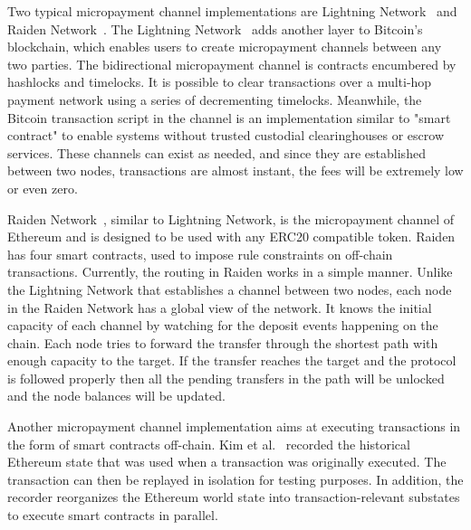 \documentclass[acmsmall]{acmart}
\begin{document}
Two typical micropayment channel implementations are Lightning Network~\cite{poon2016bitcoin} and Raiden Network~\cite{network2018raiden}.
The Lightning Network~\cite{poon2016bitcoin} adds another layer to Bitcoin’s blockchain, which enables users to create micropayment channels between any two parties. The bidirectional micropayment channel is contracts encumbered by hashlocks and timelocks. It is possible to clear transactions over a multi-hop payment network using a series of decrementing timelocks. Meanwhile, the Bitcoin transaction script in the channel is an implementation similar to "smart contract" to enable systems without trusted custodial clearinghouses or escrow services. These channels can exist as needed, and since they are established between two nodes, transactions are almost instant, the fees will be extremely low or even zero.



Raiden Network~\cite{network2018raiden}, similar to Lightning Network, is the micropayment channel of Ethereum and is designed to be used with any ERC20 compatible token. Raiden has four smart contracts, used to impose rule constraints on off-chain transactions. Currently, the routing in Raiden works in a simple manner. Unlike the Lightning Network that establishes a channel between two nodes, each node in the Raiden Network has a global view of the network. It knows the initial capacity of each channel by watching for the deposit events happening on the chain. Each node tries to forward the transfer through the shortest path with enough capacity to the target. If the transfer reaches the target and the protocol is followed properly then all the pending transfers in the path will be unlocked and the node balances will be updated.



Another micropayment channel implementation aims at executing transactions in the form of smart contracts off-chain. Kim et al.~\cite{DBLP:conf/usenix/KimJJBS21} recorded the historical Ethereum state that was used when a transaction was originally executed. The transaction can then be replayed in isolation for testing purposes. In addition, the recorder reorganizes the Ethereum world state into transaction-relevant substates to execute smart contracts in parallel.
\end{document}
